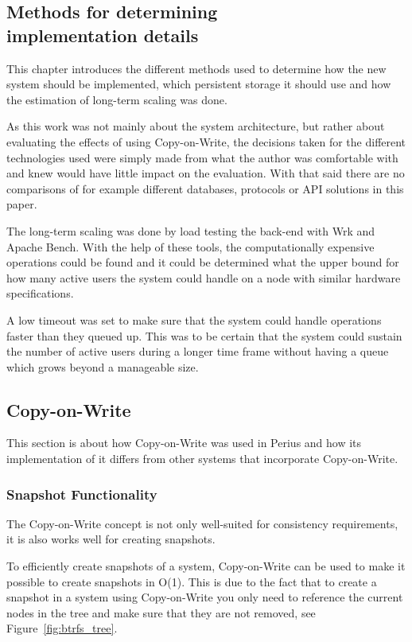 \documentclass[a4paper,12pt]{article}
\begin{document}
\subsection{Methods for determining\\implementation details}
This chapter introduces the different methods used to determine how the new system should be
implemented, which persistent storage it should use and how the estimation of long-term scaling 
was done.
\\
\par As this work was not mainly about the system architecture, but rather about evaluating the
effects of using Copy-on-Write, the decisions taken for the different technologies used were simply
made from what the author was comfortable with and knew would have little impact on the evaluation. 
With that said there are no comparisons of for example different databases, protocols or API
solutions in this paper.

\par The long-term scaling was done by load testing the back-end with Wrk and Apache Bench. With
the help of these tools, the computationally expensive operations could be found and it could be
determined what the upper bound for how many active users the system could handle on a node with
similar hardware specifications.

\par A low timeout was set to make sure that the system could handle operations faster than they
queued up. This was to be certain that the system could sustain the number of active users during a
longer time frame without having a queue which grows beyond a manageable size.

\subsection{Copy-on-Write} \label{sec:copy-on-write}
This section is about how Copy-on-Write was used in Perius and how its implementation of it differs
from other systems that incorporate Copy-on-Write.

\subsubsection{Snapshot Functionality}
The Copy-on-Write concept is not only well-suited for consistency requirements, it is also works 
well for creating snapshots.

To efficiently create snapshots of a system, Copy-on-Write can be used to make it possible to create
snapshots in O(1)\cite{BTRFS}. This is due to the fact that to create a snapshot in a system using
Copy-on-Write you only need to reference the current nodes in the tree and make sure that they are
not removed, see Figure~\ref{fig:btrfs_tree}.
\end{document}
